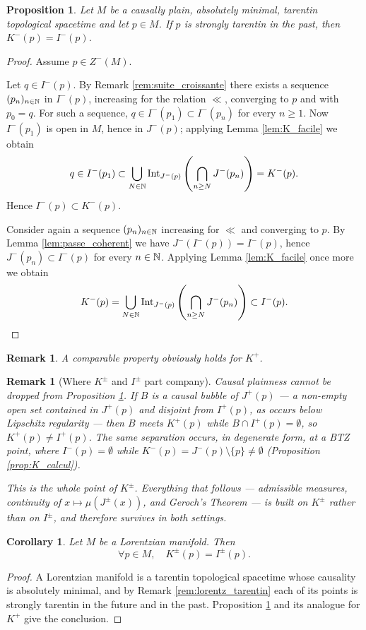 \documentclass[a4paper,twoside]{article}
\newtheorem{cor}[lem]{Corollary}
\newtheorem{prop}[lem]{Proposition}
\newtheorem{rem}[lem]{Remark}
\begin{document}
\begin{prop}\label{prop:tarentin_fort_K}
Let $M$ be a causally plain, absolutely minimal, tarentin topological spacetime and let $p\in M$.
If $p$ is strongly tarentin in the past, then $K^-(p) = I^-(p)$.
\end{prop}
\begin{proof}
Assume $p\in Z^-(M)$.

Let $q\in I^-(p)$. By Remark \ref{rem:suite_croissante} there exists a sequence $(p_n)_{n\in \mathbb{N}}$ in $I^-(p)$, increasing for the relation $\ll$,
converging to $p$ and with $p_0=q$. For such a sequence, $q\in I^-(p_1)\subset I^-(p_n)$ for every $n\geq 1$. Now
$I^-(p_1)$ is open in $M$, hence in $J^-(p)$; applying Lemma \ref{lem:K_facile} we obtain
$$ q\in I^-(p_1)\subset \bigcup_{N\in \mathbb{N}} \mathrm{Int}_{J^-(p)}\left(\bigcap_{n\geq N} J^-(p_n)\right)=K^-(p). $$
Hence $I^-(p)\subset K^-(p)$.

Consider again a sequence $(p_n)_{n\in \mathbb{N}}$ increasing for $\ll$ and converging to $p$.
By Lemma \ref{lem:passe_coherent} we have $J^-(I^-(p))=I^-(p)$, hence $J^-(p_n) \subset I^-(p)$ for every $n\in \mathbb{N}$.
Applying Lemma \ref{lem:K_facile} once more we obtain
$$K^-(p) = \bigcup_{N\in \mathbb{N}} \mathrm{Int}_{J^-(p)}\left(\bigcap_{n\geq N} J^-(p_n)\right) \subset I^-(p). $$
\end{proof}
\begin{rem}\label{rem:comparable_property_obviously_holds}
A comparable property obviously holds for $K^+$.
\end{rem}
\begin{rem}[Where $K^\pm$ and $I^\pm$ part company]\label{rem:K_neq_I}
Causal plainness cannot be dropped from Proposition \ref{prop:tarentin_fort_K}. If $B$ is a causal
bubble of $J^+(p)$ --- a non-empty open set contained in $J^+(p)$ and disjoint from $I^+(p)$, as
occurs below Lipschitz regularity \cite{MR2949547,MR3500220,samann2024nonregular} --- then $B$ meets
$K^+(p)$ while $B\cap I^+(p)=\emptyset$, so $K^+(p)\neq I^+(p)$. The same separation occurs, in
degenerate form, at a BTZ point, where $I^-(p)=\emptyset$ while
$K^-(p)=J^-(p)\setminus\{p\}\neq \emptyset$ (Proposition \ref{prop:K_calcul}).

This is the whole point of $K^\pm$. Everything that follows --- admissible measures, continuity of
$x\mapsto \mu(J^\pm(x))$, and Geroch's Theorem --- is built on $K^\pm$ rather than on $I^\pm$, and
therefore survives in both settings.
\end{rem}

\begin{cor}\label{cor:K_lorentzien} Let $M$ be a Lorentzian manifold. Then
$$\forall p\in M, \quad K^\pm(p)=I^\pm(p).$$
\end{cor}
\begin{proof}
A Lorentzian manifold is a tarentin topological spacetime whose causality is absolutely minimal,
and by Remark \ref{rem:lorentz_tarentin} each of its points is strongly tarentin in the future and
in the past. Proposition \ref{prop:tarentin_fort_K} and its analogue for $K^+$ give the conclusion.
\end{proof}
\end{document}
